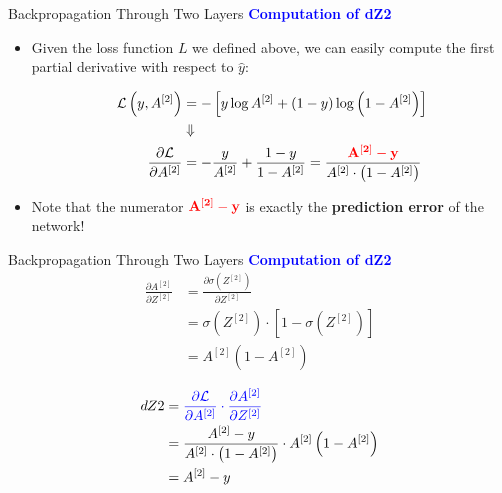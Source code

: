 \documentclass[aspectratio=169]{beamer}
\begin{document}
%
%
\begin{frame}{Backpropagation Through Two Layers}
\textbf{\textcolor{blue}{Computation of dZ2}}
\begin{itemize}
\item Given the loss function $L$ we defined above, we can easily compute the first partial derivative with respect to $\hat y$:

\begin{align*}
{\cal{L}} \left( y, A^{[2]}\right) &= -\left[ y\log{A^{[2]}} + \left( 1 - y \right)\log{\left(1 - A^{[2]}\right)}\right]\\ 
&\Downarrow \\
\frac{\partial \cal{L}}{\partial A^{[2]}} &= -\frac{y}{A^{[2]}} + \frac{1-y}{1-A^{[2]}} = \frac{\textcolor{red}{\mathbf{A^{[2]} - y}}}{A^{[2]}\cdot \left(1 - A^{[2]}\right)}
\end{align*}
\item Note that the numerator $\textcolor{red}{\mathbf{A^{[2]} - y}}$ is exactly the \textbf{prediction error} of the network! 
\end{itemize}
\end{frame}
%
%
\begin{frame}{Backpropagation Through Two Layers}
\textbf{\textcolor{blue}{Computation of dZ2}}
\begin{align*}
\frac{\partial A^{[2]}}{\partial Z^{[2]}} &= \frac{\partial \sigma\left( Z^{[2]} \right)}{\partial Z^{[2]}} \\
&= \sigma\left(Z^{[2]}\right) \cdot \left[1 - \sigma\left(Z^{[2]}\right)\right]\\
&= A^{[2]} \left( 1 - A^{[2]} \right)
\end{align*}

\begin{align*}
dZ2 &= \textcolor{blue}{\frac{\partial \mathcal{L}}{\partial A^{[2]}} \cdot \frac{\partial A^{[2]}}{\partial Z^{[2]}}}  
\\
&=\frac{A^{[2]} - y}{A^{[2]}\cdot \left(1 - A^{[2]}\right)} \cdot A^{[2]} \left( 1 - A^{[2]} \right)
\\
&= A^{[2]} - y
\end{align*}
\end{frame}
%
%
\end{document}
